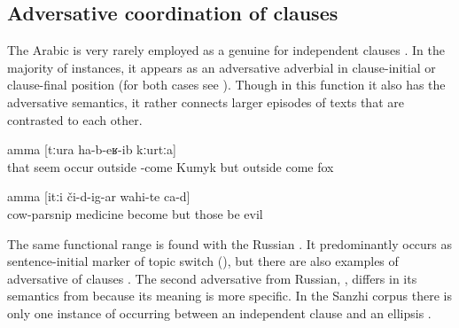 
\subsection{Adversative coordination of clauses}
\label{ssec:Adversative coordination of clauses}

The Arabic    is very rarely employed as a genuine  for independent clauses . In the majority of instances, it appears as an adversative adverbial in clause-initial  or clause-final position  (for both cases see ). Though in this function it also has the adversative semantics, it rather connects larger episodes of texts that are contrasted to each other.

\begin{exe}
	\ex	\label{ex:‎‎‎He thought that the Kumyk man would come out (of the pit), but a fox came out}
		amma	[tːura	ha-b-eʁ-ib kːurtːa]\\
		that	seem	occur	outside -come	Kumyk		but	outside come	fox\\
	\glt	{}

	\ex	\label{ex:‎‎‎There is this medical cow-parsnip, but if these (plants) get on (the skin), it is bad}
	\gll	[birikːʷa=ra	darman-na	d-irχʷ-ar]	amma	[itːi	či-d-ig-ar	wahi-te	ca-d]\\
		cow-parsnip	medicine	become	but	those	be	evil \\
	\glt	{}
\end{exe}

The same functional range is found with the Russian   . It predominantly occurs as sentence-initial marker of topic switch (), but there are also examples of adversative  of clauses . The second adversative  from Russian,  , differs in its semantics from  because its meaning is more specific. In the Sanzhi corpus there is only one instance of  occurring between an independent clause and an ellipsis .

